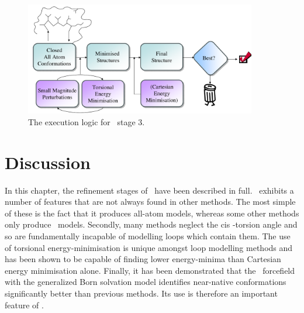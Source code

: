 \begin{figure}[htbp]
\begin{center}
\includegraphics[width=0.9\textwidth]{./06-PreArcus/stage-3/stage-3.pdf}
\end{center}
\caption{The execution logic for \prearcus\ stage 3.}
\label{fig:prearcus:stage_3}
\end{figure}

\section{Discussion}

In this chapter, the refinement stages of \prearcus\ have been described in full. \prearcus\ exhibits a number of features that are not always found in other methods. The most simple of these is the fact that it produces all-atom models, whereas some other methods only produce \mainchain\ models\cite{METHOD:Petra}. Secondly, many methods neglect the cis \Omg-torsion angle and so are fundamentally incapable of modelling loops which contain them\cite{METHOD:CLOOP,METHOD:Plop,METHOD:Petra}. The use of  torsional energy-minimisation is unique amongst loop modelling methods and has been shown to be capable of finding lower energy-minima than Cartesian energy minimisation alone.
Finally,
it has been demonstrated that the \amberff\ forcefield
with the generalized Born solvation model identifies
near-native conformations significantly better than
previous methods\cite{METHOD:RapperA,METHOD:RapperB}.
Its use is therefore an important feature of \prearcus.

